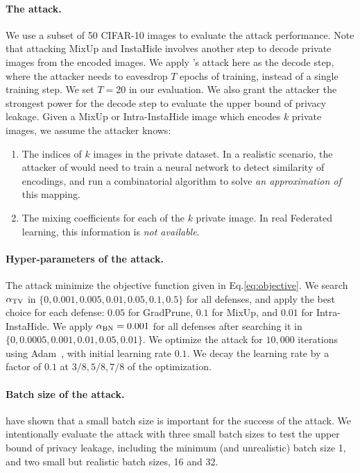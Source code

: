 \paragraph{The attack.} We use a subset of 50 CIFAR-10 images to evaluate the attack performance. Note that attacking MixUp and InstaHide involves another step to decode private images from the encoded images. We apply \citep{carlini2020attack}'s attack here as the decode step, where the attacker needs to eavesdrop $T$ epochs of training, instead of a single training step. We set $T=20$ in our evaluation. We also grant the attacker the strongest power for the decode step to evaluate the upper bound of privacy leakage. Given a MixUp or Intra-InstaHide image which encodes $k$ private images, we assume the attacker knows:
\begin{enumerate}
  \item The indices of $k$ images in the private dataset. In a realistic scenario, the attacker of \citep{carlini2020attack} would need to train a neural network to detect similarity of encodings, and run a combinatorial algorithm to solve {\em an approximation of} this mapping.
  \item The mixing coefficients for each of the $k$ private image. In real Federated learning, this information is \textit{not available}.
\end{enumerate}


\paragraph{Hyper-parameters of the attack.} The attack minimize the objective function given in Eq.\ref{eq:objective}. 
We search $\alpha_{\rm TV}$ in $\{0, 0.001, 0.005, 0.01, 0.05, 0.1, 0.5\}$ for all defenses, and apply the best choice for each defense: $0.05$ for GradPrune, $0.1$ for MixUp, and $0.01$ for Intra-InstaHide. We apply $\alpha_{\rm BN}=0.001$ for all defenses after searching it in $\{0, 0.0005, 0.001, 0.01, 0.05, 0.01\}$. We optimize the attack for $10,000$ iterations using Adam~\citep{kingma2014adam}, with initial learning rate $0.1$. We decay the learning rate by a factor of $0.1$ at $3/8, 5/8, 7/8$ of the optimization. 

\paragraph{Batch size of the attack.} \citep{zhu2020deep, geiping2020inverting} have shown that a small batch size is important for the success of the attack. We intentionally evaluate the attack with three small batch sizes to test the upper bound of privacy leakage, including the minimum (and unrealistic) batch size 1, and two small but realistic batch sizes, 16 and 32.

